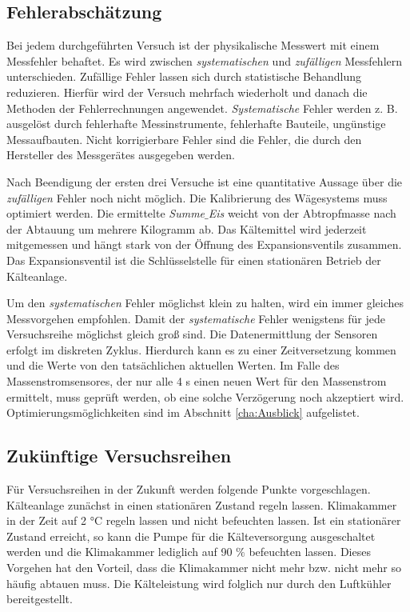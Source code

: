 \subsection{Fehlerabschätzung}

Bei jedem durchgeführten Versuch ist der physikalische Messwert mit einem Messfehler behaftet. Es wird zwischen \textit{systematischen} und \textit{zufälligen} Messfehlern unterschieden. Zufällige Fehler lassen sich durch statistische Behandlung reduzieren. Hierfür wird der Versuch mehrfach wiederholt und danach die Methoden der Fehlerrechnungen angewendet. \textit{Systematische} Fehler werden z. B. ausgelöst durch fehlerhafte Messinstrumente, fehlerhafte Bauteile, ungünstige Messaufbauten.
Nicht korrigierbare Fehler sind die Fehler, die durch den Hersteller des Messgerätes ausgegeben werden. 

Nach Beendigung der ersten drei Versuche ist eine quantitative Aussage über die \textit{zufälligen} Fehler noch nicht möglich. Die Kalibrierung des Wägesystems muss optimiert werden. Die ermittelte \textit{Summe$\_$Eis} weicht von der Abtropfmasse nach der Abtauung um mehrere Kilogramm ab. Das Kältemittel wird jederzeit mitgemessen und hängt stark von der Öffnung des Expansionsventils zusammen. Das Expansionsventil ist die Schlüsselstelle für einen stationären Betrieb der Kälteanlage. 

Um den \textit{systematischen} Fehler möglichst klein zu halten, wird ein immer gleiches Messvorgehen empfohlen. Damit der \textit{systematische} Fehler wenigstens für jede Versuchsreihe möglichst gleich groß sind. 
Die Datenermittlung der Sensoren erfolgt im diskreten Zyklus. Hierdurch kann es zu einer Zeitversetzung kommen und die Werte von den tatsächlichen aktuellen Werten. Im Falle des Massenstromsensores, der nur alle 4 s einen neuen Wert für den Massenstrom ermittelt, muss geprüft werden, ob eine solche Verzögerung noch akzeptiert wird. Optimierungsmöglichkeiten sind im Abschnitt \ref{cha:Ausblick} aufgelistet. 

\subsection{Zukünftige Versuchsreihen}

Für Versuchsreihen in der Zukunft werden folgende Punkte vorgeschlagen. Kälteanlage zunächst in einen stationären Zustand regeln lassen. Klimakammer in der Zeit auf 2 °C regeln lassen und nicht befeuchten lassen. Ist ein stationärer Zustand erreicht, so kann die Pumpe für die Kälteversorgung ausgeschaltet werden und die Klimakammer lediglich auf 90 $\%$ befeuchten lassen. Dieses Vorgehen hat den Vorteil, dass die Klimakammer nicht mehr bzw. nicht mehr so häufig abtauen muss. Die Kälteleistung wird folglich nur durch den Luftkühler bereitgestellt. 

